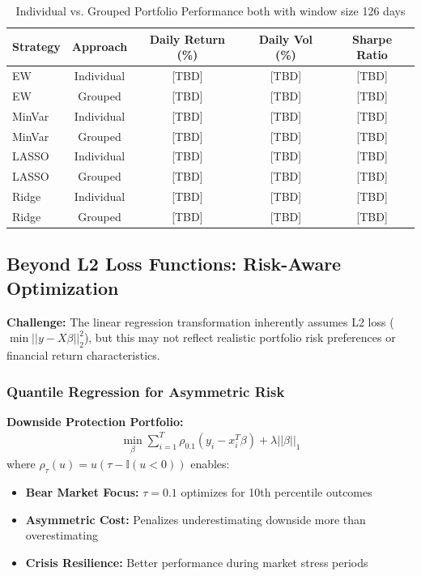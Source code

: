 \documentclass[12pt]{article}
\begin{document}
\begin{table}[h]
\centering
\caption{Individual vs. Grouped Portfolio Performance both with window size 126 days}
\label{tab:grouping_comparison}
\begin{tabular}{lcccc}
\hline
Strategy & Approach & Daily Return (\%) & Daily Vol (\%) & Sharpe Ratio \\
\hline
EW & Individual & [TBD] & [TBD] & [TBD] \\
EW & Grouped & [TBD] & [TBD] & [TBD] \\
MinVar & Individual & [TBD] & [TBD] & [TBD] \\
MinVar & Grouped & [TBD] & [TBD] & [TBD] \\
LASSO & Individual & [TBD] & [TBD] & [TBD] \\
LASSO & Grouped & [TBD] & [TBD] & [TBD] \\
Ridge & Individual & [TBD] & [TBD] & [TBD] \\
Ridge & Grouped & [TBD] & [TBD] & [TBD] \\
\hline
\end{tabular}
\end{table}

\subsection{Beyond L2 Loss Functions: Risk-Aware Optimization}

\textbf{Challenge:} The linear regression transformation inherently assumes L2 loss ($\min ||y - X\beta||_2^2$), but this may not reflect realistic portfolio risk preferences or financial return characteristics.

\subsubsection{Quantile Regression for Asymmetric Risk}
\textbf{Downside Protection Portfolio:}
\begin{align}
\min_\beta \sum_{i=1}^T \rho_{0.1}(y_i - x_i^T\beta) + \lambda ||\beta||_1
\end{align}
where $\rho_\tau(u) = u(\tau - \mathbb{I}(u < 0))$ enables:
\begin{itemize}
    \item \textbf{Bear Market Focus:} $\tau = 0.1$ optimizes for 10th percentile outcomes
    \item \textbf{Asymmetric Cost:} Penalizes underestimating downside more than overestimating
    \item \textbf{Crisis Resilience:} Better performance during market stress periods
\end{itemize}
\end{document}
